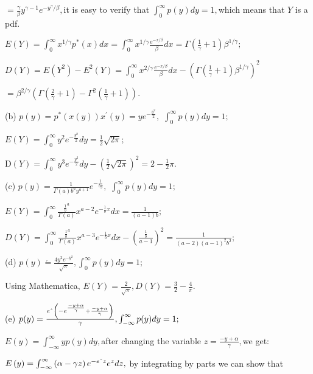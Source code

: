 \documentclass{article}
\begin{document}
$=\frac{\gamma }{\beta }y^{\gamma -1}e^{-y^{\gamma }/\beta },$it is easy to
verify that $\int_{0}^{\infty }p(y)dy=1,$which means that $Y$ is a pdf.

$E\left( Y\right) =\int_{0}^{\infty }x^{1/\gamma }p^{\ast }\left( x\right)
dx=\int_{0}^{\infty }x^{1/\gamma }\frac{e^{-x/\beta }}{\beta }dx=\Gamma
\left( \frac{1}{\gamma }+1\right) \beta ^{1/\gamma };$

$D\left( Y\right) =E\left( Y^{2}\right) -E^{2}\left( Y\right)
=\int_{0}^{\infty }x^{2/\gamma }\frac{e^{-x/\beta }}{\beta }dx-\left( \Gamma
\left( \frac{1}{\gamma }+1\right) \beta ^{1/\gamma }\right) ^{2}$

$=\beta ^{2/\gamma }\left( \Gamma \left( \frac{2}{\gamma }+1\right) -\Gamma
^{2}\left( \frac{1}{\gamma }+1\right) \right) .$

(b) $p(y)=p^{\ast }(x\left( y\right) )x^{\prime }(y)=ye^{-\frac{y^{2}}{2}},$ 
$\int_{0}^{\infty }p(y)dy=1;$

$E(Y)=\int_{0}^{\infty }y^{2}e^{-\frac{y^{2}}{2}}dy=\allowbreak \frac{1}{2}%
\sqrt{2\pi };$

D$\left( Y\right) =\int_{0}^{\infty }y^{3}e^{-\frac{y^{2}}{2}}dy-\left( 
\frac{1}{2}\sqrt{2\pi }\right) ^{2}=\allowbreak 2-\frac{1}{2}\pi .$

(c) $p(y)=\frac{1}{\Gamma \left( a\right) b^{a}y^{a+1}}e^{-\frac{1}{by}},$ $%
\int_{0}^{\infty }p(y)dy=1;$

$E(Y)=\int_{0}^{\infty }\frac{\frac{1}{b}^{a}}{\Gamma \left( a\right) }%
x^{a-2}e^{-\frac{1}{b}x}dx=\frac{1}{\left( a-1\right) b};$

$D\left( Y\right) =\int_{0}^{\infty }\frac{\frac{1}{b}^{a}}{\Gamma \left(
a\right) }x^{a-3}e^{-\frac{1}{b}x}dx-\left( \frac{\frac{1}{b}}{a-1}\right)
^{2}=\frac{1}{\left( a-2\right) \left( a-1\right) ^{2}b^{2}};$

(d) $p\left( y\right) \acute{=}\frac{4y^{2}e^{-y^{2}}}{\sqrt{\pi }}%
,\int_{0}^{\infty }p(y)dy=1;$

Using Mathematica, $E\left( Y\right) =\frac{2}{\sqrt{\pi }},D\left( Y\right)
=\frac{3}{2}-\frac{4}{\pi }.$

(e) $p(y)=\frac{e\symbol{94}\left( -e^{\frac{-y+\alpha }{\gamma }}+\frac{%
-y+\alpha }{\gamma }\right) }{\gamma },\int_{-\infty }^{\infty }p(y)dy=1;$

$E\left( y\right) =\int_{-\infty }^{\infty }yp(y)dy,$after changing the
variable $z=\frac{-y+\alpha }{\gamma },$we get:

$E\left( y\right) =\int_{-\infty }^{\infty }\left( \alpha -\gamma z\right)
e^{-e\symbol{94}z}e^{z}dz,$ by integrating by parts we can show that
\end{document}
